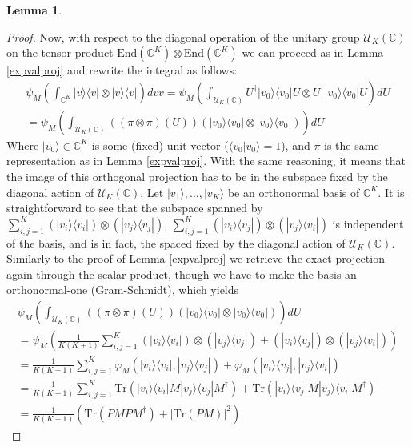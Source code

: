 \documentclass[12pt,a4paper,BCOR15mm,twoside,DIV12]{article}
\def\C{\mathbb{C}}
\def\U{\mathcal{U}}
\def\End{\text{End}}
\def\Tr{\text{Tr}}
\theoremstyle{definition}
\newtheorem{lem}[Satz]{Lemma}
\begin{document}
\begin{lem}
\begin{proof}
Now, with respect to the diagonal operation of the unitary group $\U_K(\C)$ on the tensor product $\End(\C^K) \otimes \End(\C^K)$ we can proceed as in Lemma \ref{expvalproj} and rewrite the integral as follows:
\begin{align*}
  \psi_M(\int_{\C^K}|v \rangle \langle v| \otimes |v \rangle \langle v|) dvv = \psi_M( \int_{\U_K(\C)} U^\dagger |v_0 \rangle \langle v_0| U \otimes U^\dagger |v_0 \rangle \langle v_0| U) dU \\ = \psi_M( \int_{\U_K(\C)} ((\pi \otimes \pi)(U))( |v_0 \rangle \langle v_0|  \otimes |v_0 \rangle \langle v_0|)) dU
\end{align*}
Where $|v_0 \rangle \in \C^K$ is some (fixed) unit vector ($\langle v_0 | v_0 \rangle = 1$), and $\pi$ is the same representation as in Lemma \ref{expvalproj}. With the same reasoning, it means that the image of this orthogonal projection has to be in the subspace fixed by the diagonal action of $\U_K(\C)$. Let $|v_1 \rangle, \ldots, |v_K \rangle$ be an orthonormal basis of $\C^K$. It is straightforward to see that the subspace spanned by $\sum_{i,j=1}^K (|v_i \rangle \langle v_i |) \otimes (|v_j \rangle \langle v_j |)  $, $\sum_{i,j=1}^K (|v_i \rangle \langle v_j |) \otimes (|v_j \rangle \langle v_i |)$ is independent of the basis, and is in fact, the spaced fixed by the diagonal action of $\U_K(\C)$. Similarly to the proof of Lemma \ref{expvalproj} we retrieve the exact projection again through the scalar product, though we have to make the basis an orthonormal-one (Gram-Schmidt), which yields
\begin{align*}
\psi_M( \int_{\U_K(\C)} ((\pi \otimes \pi)(U))( |v_0 \rangle \langle v_0|  \otimes |v_0 \rangle \langle v_0|)) dU \\
 = \psi_M(  \frac{1}{K(K+1)} \sum_{i,j=1}^K (|v_i \rangle \langle v_i |) \otimes (|v_j \rangle \langle v_j |) + (|v_i \rangle \langle v_j |) \otimes (|v_j \rangle \langle v_i |)) \\
=    \frac{1}{K(K+1)} \sum_{i,j=1}^K \varphi_M(|v_i \rangle \langle v_i |,|v_j \rangle \langle v_j |) + \varphi_M(|v_i \rangle \langle v_j |, |v_j \rangle \langle v_i |) \\
=  \frac{1}{K(K+1)} \sum_{i,j=1}^K \Tr(|v_i \rangle \langle v_i | M |v_j \rangle \langle v_j | M^\dagger) + \Tr(|v_i \rangle \langle v_j | M |v_j \rangle \langle v_i | M^\dagger) \\ 
=  \frac{1}{K(K+1)} (\Tr(P M P M^\dagger) + |\Tr(P M)|^2)
\end{align*}
\end{proof}
\end{lem}
\end{document}
